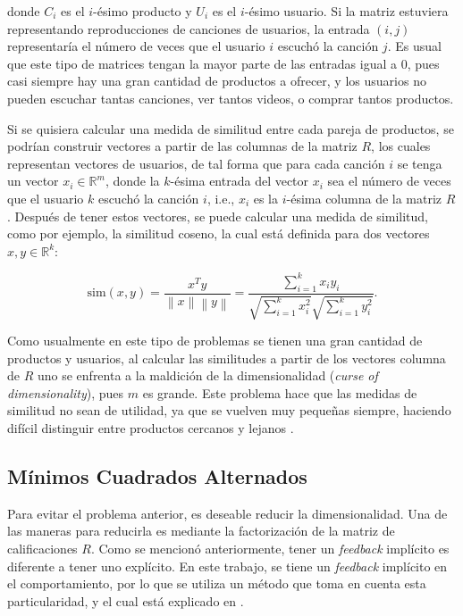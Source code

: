 \documentclass[conference]{IEEEtran}
\newcommand{\norm}[1]{\left\lVert#1\right\rVert}
\begin{document}
donde $C_i$ es el $i$-ésimo producto y $U_i$ es el $i$-ésimo usuario. Si la matriz estuviera representando reproducciones de canciones de usuarios, la entrada $(i, j)$ representaría el número de veces que el usuario $i$ escuchó la canción $j$. Es usual que este tipo de matrices tengan la mayor parte de las entradas igual a $0$, pues casi siempre hay una gran cantidad de productos a ofrecer, y los usuarios no pueden escuchar tantas canciones, ver tantos videos, o comprar tantos productos.

Si se quisiera calcular una medida de similitud entre cada pareja de productos, se podrían construir vectores a partir de las columnas de la matriz $R$, los cuales representan vectores de usuarios, de tal forma que para cada canción $i$ se tenga un vector $x_i \in \mathbb{R}^m$, donde la $k$-ésima entrada del vector $x_i$ sea el número de veces que el usuario $k$ escuchó la canción $i$, i.e., $x_i$ es la $i$-ésima columna de la matriz $R$. Después de tener estos vectores, se puede calcular una medida de similitud, como por ejemplo, la similitud coseno, la cual está definida para dos vectores $x, y \in \mathbb{R}^k$:

\begin{equation}
\label{eq:cosine_sim}
    \mathrm{sim}(x, y) = \frac{x^T y}{\norm{x} \norm{y}} = \frac{\sum_{i = 1}^k x_i y_i}{\sqrt{\sum_{i = 1}^k x_i^2}\sqrt{\sum_{i = 1}^k y_i^2}}.
\end{equation}

Como usualmente en este tipo de problemas se tienen una gran cantidad de productos y usuarios, al calcular las similitudes a partir de los vectores columna de $R$ uno se enfrenta a la maldición de la dimensionalidad (\textit{curse of dimensionality}), pues $m$ es grande. Este problema hace que las medidas de similitud no sean de utilidad, ya que se vuelven muy pequeñas siempre, haciendo difícil distinguir entre productos cercanos y lejanos  \cite{beyer1999nearest}.

\subsection{Mínimos Cuadrados Alternados}

Para evitar el problema anterior, es deseable reducir la dimensionalidad. Una de las maneras para reducirla es mediante la factorización de la matriz de calificaciones $R$. Como se mencionó anteriormente, tener un \textit{feedback} implícito es diferente a tener uno explícito. En este trabajo, se tiene un \textit{feedback} implícito en el comportamiento, por lo que se utiliza un método que toma en cuenta esta particularidad, y el cual está explicado en \cite{hu2008collaborative}. 
\end{document}
